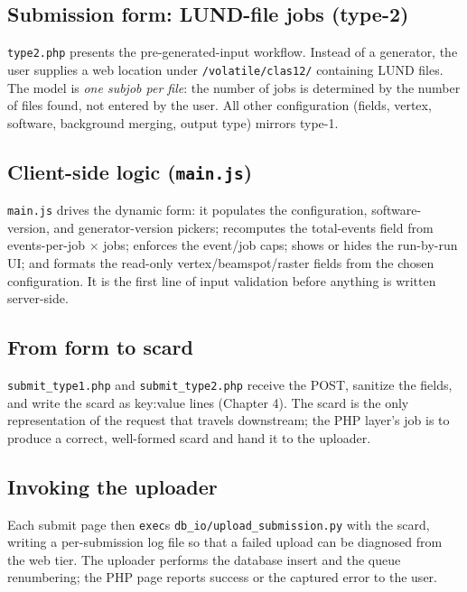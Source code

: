 \subsection{Submission form: LUND-file jobs (type-2)}

\texttt{type2.\allowbreak{}php} presents the pre-generated-input workflow. Instead of a generator, the user
supplies a web location under \texttt{/\allowbreak{}volatile/\allowbreak{}clas12/\allowbreak{}} containing LUND
files. The model is \textit{one subjob per file}: the number of jobs is determined by the number of files
found, not entered by the user. All other configuration (fields, vertex, software, background merging, output
type) mirrors type-1.

\subsection{Client-side logic (\texttt{main.\allowbreak{}js})}

\texttt{main.\allowbreak{}js} drives the dynamic form: it populates the configuration, software-version, and
generator-version pickers; recomputes the total-events field from events-per-job $\times$ jobs; enforces the
event/job caps; shows or hides the run-by-run UI; and formats the read-only vertex/beamspot/raster fields from
the chosen configuration. It is the first line of input validation before anything is written server-side.

\subsection{From form to scard}

\texttt{submit\_\allowbreak{}type1.\allowbreak{}php} and \texttt{submit\_\allowbreak{}type2.\allowbreak{}php}
receive the POST, sanitize the fields, and write the scard as key:value lines (Chapter 4). The scard is the
only representation of the request that travels downstream; the PHP layer's job is to produce a correct,
well-formed scard and hand it to the uploader.

\subsection{Invoking the uploader}

Each submit page then \texttt{exec}s
\texttt{db\_\allowbreak{}io/\allowbreak{}upload\_\allowbreak{}submission.\allowbreak{}py} with the scard,
writing a per-submission log file so that a failed upload can be diagnosed from the web tier. The uploader
performs the database insert and the queue renumbering; the PHP page reports success or the captured error to
the user.

